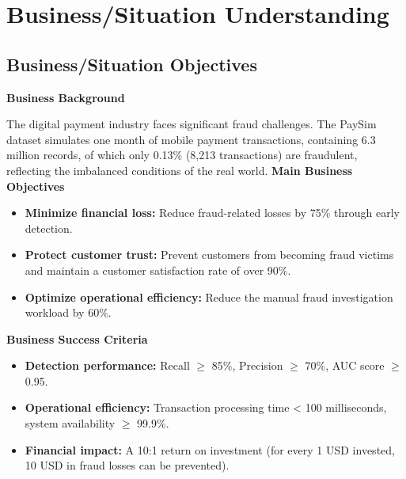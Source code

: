 \documentclass[sigplan,screen]{acmart}
\begin{document}



\maketitle

\section{Business/Situation Understanding}
\subsection{Business/Situation Objectives}
\textbf{Business Background}

The digital payment industry faces significant fraud challenges. The PaySim dataset simulates one month of mobile payment transactions, containing 6.3 million records, of which only 0.13\% (8,213 transactions) are fraudulent, reflecting the imbalanced conditions of the real world.
\textbf{Main Business Objectives}

\begin{itemize}
\item \textbf{Minimize financial loss:} Reduce fraud-related losses by 75\% through early detection.
\item \textbf{Protect customer trust:} Prevent customers from becoming fraud victims and maintain a customer satisfaction rate of over 90\%.
\item \textbf{Optimize operational efficiency:} Reduce the manual fraud investigation workload by 60\%.
\end{itemize}

\textbf{Business Success Criteria}

\begin{itemize}
\item \textbf{Detection performance:} Recall $\geq$ 85\%, Precision $\geq$ 70\%, AUC score $\geq$ 0.95.
\item \textbf{Operational efficiency:} Transaction processing time < 100 milliseconds, system availability $\geq$ 99.9\%.
\item \textbf{Financial impact:} A 10:1 return on investment (for every 1 USD invested, 10 USD in fraud losses can be prevented).
\end{itemize}
\end{document}
